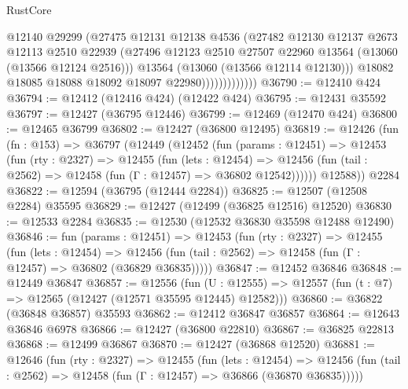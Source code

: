 \begin{lexlean}{RustCore}
\begin{coremodule}
                            @12140
                            @29299
                            (@27475
                              @12131
                              @12138
                              @4536
                              (@27482
                                @12130
                                @12137
                                @2673
                                @12113
                                @2510
                                @22939
                                (@27496
                                  @12123
                                  @2510
                                  @27507
                                  @22960
                                  @13564
                                  (@13060 (@13566 @12124 @2516)))
                                @13564
                                (@13060 (@13566 @12114 @12130)))
                              @18082
                              @18085
                              @18088
                              @18092
                              @18097
                              @22980)))))))))))))
@36790 := @12410 @424
@36794 := @12412 (@12416 @424) (@12422 @424)
@36795 := @12431 @35592
@36797 := @12427 (@36795 @12446)
@36799 := @12469 (@12470 @424)
@36800 := @12465 @36799
@36802 := @12427 (@36800 @12495)
@36819 := @12426
    (fun (fn : @153) =>
    @36797
      (@12449
        (@12452
          (fun (params : @12451) =>
          @12453
            (fun (rty : @2327) =>
            @12455
              (fun (lets : @12454) =>
              @12456 (fun (tail : @2562) => @12458 (fun (Γ : @12457) => @36802 @12542))))))
        @12588))
    @2284
@36822 := @12594 (@36795 (@12444 @2284))
@36825 := @12507 (@12508 @2284) @35595
@36829 := @12427 (@12499 (@36825 @12516) @12520)
@36830 := @12533 @2284
@36835 := @12530 (@12532 @36830 @35598 @12488 @12490)
@36846 := fun (params : @12451) =>
  @12453
    (fun (rty : @2327) =>
    @12455
      (fun (lets : @12454) =>
      @12456 (fun (tail : @2562) => @12458 (fun (Γ : @12457) => @36802 (@36829 @36835)))))
@36847 := @12452 @36846
@36848 := @12449 @36847
@36857 := @12556
    (fun (U : @12555) => @12557 (fun (t : @7) => @12565 (@12427 (@12571 @35595 @12445) @12582)))
@36860 := @36822 (@36848 @36857) @35593
@36862 := @12412 @36847 @36857
@36864 := @12643 @36846 @6978
@36866 := @12427 (@36800 @22810)
@36867 := @36825 @22813
@36868 := @12499 @36867
@36870 := @12427 (@36868 @12520)
@36881 := @12646
    (fun (rty : @2327) =>
    @12455
      (fun (lets : @12454) =>
      @12456 (fun (tail : @2562) => @12458 (fun (Γ : @12457) => @36866 (@36870 @36835)))))

\end{coremodule}
\end{lexlean}
